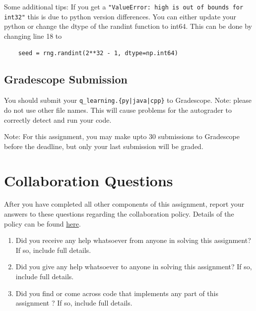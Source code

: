 \documentclass[11pt,addpoints,answers]{exam}
\begin{document}
Some additional tips: If you get a \texttt{"ValueError: high is out of bounds for int32"} this is due to python version differences. You can either update your python or change the dtype of the randint function to int64. This can be done by changing line 18 to
\begin{verbatim}
    seed = rng.randint(2**32 - 1, dtype=np.int64)
\end{verbatim}


\subsection{Gradescope Submission}

You should submit your \texttt{q\_learning.\{py|java|cpp\}} to Gradescope.
Note: please do not use other file names. This will cause problems for the autograder to correctly detect and run your code.

Note: For this assignment, you may make upto 30 submissions to Gradescope before the deadline, but only your last submission will be graded.

\newpage
\section{Collaboration Questions}
After you have completed all other components of this assignment, report your answers to these questions regarding the collaboration policy. Details of the policy can be found \href{http://www.cs.cmu.edu/~mgormley/courses/10601/syllabus.html}{here}.
\begin{enumerate}
    \item Did you receive any help whatsoever from anyone in solving this assignment? If so, include full details.
    \item Did you give any help whatsoever to anyone in solving this assignment? If so, include full details.
    \item Did you find or come across code that implements any part of this assignment ? If so, include full details.
\end{enumerate}

\begin{your_solution}[height=6cm]

\end{your_solution}
\end{document}
